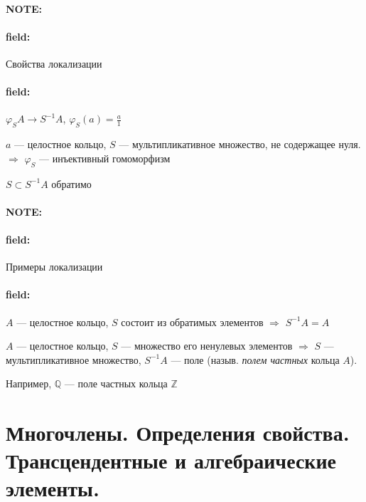 \documentclass[12pt]{article}
\newenvironment{note}{\paragraph{NOTE:}}{}
\newenvironment{field}{\paragraph{field:}}{}
\begin{document}
\begin{note}
  \begin{field}
    Свойства локализации
  \end{field}
  \begin{field}
    $\varphi_{S}A \rightarrow S^{-1}A$, $\varphi_{S}(a) = \frac{a}{1}$

    $a$ --- целостное кольцо, $S$ --- мультипликативное множество, не содержащее нуля.
    $\Rightarrow$ $\varphi_{S}$ --- инъективный гомоморфизм

    $S \subset S^{-1}A$ обратимо
  \end{field}
\end{note}

\begin{note}
  \begin{field}
    Примеры локализации
  \end{field}
  \begin{field}
    $A$ --- целостное кольцо, $S$ состоит из обратимых элементов
    $\Rightarrow$ $S^{-1}A = A$

    $A$ --- целостное кольцо, $S$ --- множество его ненулевых элементов
    $\Rightarrow$ $S$ --- мультипликативное множество,
    $S^{-1}A$ --- поле (назыв. \emph{полем частных} кольца $A$).

    Например, $\mathbb{Q}$ --- поле частных кольца $\mathbb{Z}$
  \end{field}
\end{note}

\section{Многочлены. Определения свойства. Трансцендентные и алгебраические
  элементы.}

\end{document}
